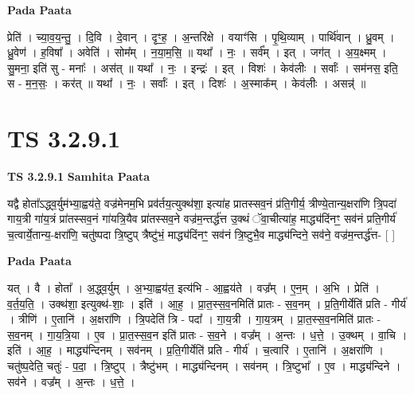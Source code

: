 \documentclass[17pt]{extarticle}
\begin{document}
\textbf{Pada Paata} \newline

प्रेति॑ । च्या॒व॒य॒न्तु॒ । दि॒वि । दे॒वान् । दृꣳ॒॒ह॒ । अ॒न्तरि॑क्षे । वयाꣳ॑सि । पृ॒थि॒व्याम् । पार्थि॑वान् । ध्रु॒वम् । ध्रु॒वेण॑ । ह॒विषा᳚ । अवेति॑ । सोम᳚म् । न॒या॒म॒सि॒ ॥ यथा᳚ । नः॒ । सर्व᳚म् । इत् । जग॑त् । अ॒य॒क्ष्मम् । सु॒मना॒ इति॑ सु - मनाः᳚ । अस॑त् ॥ यथा᳚ । नः॒ । इन्द्रः॑ । इत् । विशः॑ । केव॑लीः । सर्वाः᳚ । सम॑नस॒ इति॒ स - म॒न॒सः॒ । कर॑त् ॥ यथा᳚ । नः॒ । सर्वाः᳚ । इत् । दिशः॑ । अ॒स्माक᳚म् । केव॑लीः । असन्न्॑ ॥  \newline




\section*{ TS 3.2.9.1 }

\textbf{TS 3.2.9.1 } \newline
\textbf{Samhita Paata} \newline

यद्वै होता᳚ऽद्ध्व॒र्युम॑भ्या॒ह्वय॑ते॒ वज्र॑मेनम॒भि प्रव॑र्तय॒त्युक्थ॑शा॒ इत्या॑ह प्रातस्सव॒नं प्र॑ति॒गीर्य॒ त्रीण्ये॒तान्य॒क्षरा॑णि त्रि॒पदा॑ गाय॒त्री गा॑य॒त्रं प्रा॑तस्सव॒नं गा॑यत्रि॒यैव प्रा॑तस्सव॒ने वज्र॑म॒न्तर्द्ध॑त्त उ॒क्थं ॅवा॒चीत्या॑ह॒ माद्ध्य॑दिंनꣳ॒॒ सव॑नं प्रति॒गीर्य॑ च॒त्वार्ये॒तान्य॒-क्षरा॑णि॒ चतु॑ष्पदा त्रि॒ष्टुप् त्रैष्टु॑भं॒ माद्ध्य॑दिंनꣳ॒॒ सव॑नं त्रि॒ष्टुभै॒व माद्ध्य॑न्दिने॒ सव॑ने॒ वज्र॑म॒न्तर्द्ध॑त्त-  [  ] \newline

\textbf{Pada Paata} \newline

यत् । वै । होता᳚ । अ॒द्ध्व॒र्युम् । अ॒भ्या॒ह्वय॑त॒ इत्य॑भि - आ॒ह्वय॑ते । वज्र᳚म् । ए॒न॒म् । अ॒भि । प्रेति॑ । व॒र्त॒य॒ति॒ । उक्थ॑शा॒ इत्युक्थ॑-शाः॒ । इति॑ । आ॒ह॒ । प्रा॒त॒स्स॒व॒नमिति॑ प्रातः - स॒व॒नम् । प्र॒ति॒गीर्येति॑ प्रति - गीर्य॑ । त्रीणि॑ । ए॒तानि॑ । अ॒क्षरा॑णि । त्रि॒पदेति॑ त्रि - पदा᳚ । गा॒य॒त्री । गा॒य॒त्रम् । प्रा॒त॒स्स॒व॒नमिति॑ प्रातः - स॒व॒नम् । गा॒य॒त्रि॒या । ए॒व । प्रा॒त॒स्स॒व॒न इति॑ प्रातः - स॒व॒ने । वज्र᳚म् । अ॒न्तः । ध॒त्ते॒ । उ॒क्थम् । वा॒चि । इति॑ । आ॒ह॒ । माद्ध्य॑न्दिनम् । सव॑नम् । प्र॒ति॒गीर्येति॑ प्रति - गीर्य॑ । च॒त्वारि॑ । ए॒तानि॑ । अ॒क्षरा॑णि । चतु॑ष्प॒देति॒ चतुः॑ - प॒दा॒ । त्रि॒ष्टुप् । त्रैष्टु॑भम् । माद्ध्य॑न्दिनम् । सव॑नम् । त्रि॒ष्टुभा᳚ । ए॒व । माद्ध्य॑न्दिने । सव॑ने । वज्र᳚म् । अ॒न्तः । ध॒त्ते॒ ।  \newline
\end{document}

